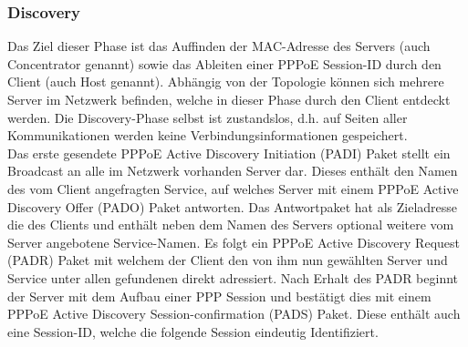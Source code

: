 \documentclass[journal,11pt]{IEEEtran}
\begin{document}
\subsubsection{Discovery}
Das Ziel dieser Phase ist das Auffinden der MAC-Adresse des Servers (auch Concentrator genannt)
sowie das Ableiten einer PPPoE Session-ID durch den Client (auch Host genannt).
Abhängig von der Topologie können sich mehrere Server im Netzwerk befinden, welche in
dieser Phase durch den Client entdeckt werden. Die Discovery-Phase selbst ist zustandslos, d.h.
auf Seiten aller Kommunikationen werden keine Verbindungsinformationen gespeichert.\\
Das erste gesendete PPPoE Active Discovery Initiation (PADI) Paket stellt ein Broadcast
an alle im Netzwerk vorhanden Server dar. Dieses enthält den Namen des vom Client
angefragten Service, auf welches Server mit einem
PPPoE Active Discovery Offer (PADO) Paket antworten. Das Antwortpaket
hat als Zieladresse die des Clients und enthält neben dem Namen des Servers optional
weitere vom Server angebotene Service-Namen. Es folgt ein PPPoE Active Discovery Request (PADR) Paket
mit welchem der Client den von ihm nun gewählten Server und Service unter allen
gefundenen direkt adressiert. Nach Erhalt des PADR beginnt der Server mit dem Aufbau
einer PPP Session und bestätigt dies mit einem PPPoE Active Discovery Session-confirmation (PADS) Paket.
Diese enthält auch eine Session-ID, welche die folgende Session eindeutig Identifiziert.\\
%
\end{document}
